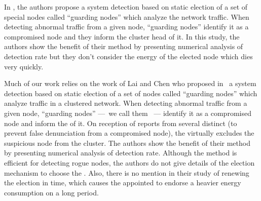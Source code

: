
In
\cite{LC08},
the authors propose a system detection based on static election of a set of special nodes called ``guarding nodes'' which analyze the network traffic.
When detecting abnormal traffic from a given node, ``guarding nodes'' identify it as a compromised node and they inform the cluster head of it.
In this study, the authors show the benefit of their method by presenting numerical analysis of detection rate but they don't consider the energy of the elected node which dies very quickly.


Much of our work relies on the work of Lai and Chen who proposed in~\cite{LC08} a system detection based on static election of a set of nodes called ``guarding nodes'' which analyze traffic in a clustered network.
When detecting abnormal traffic from a given node, ``guarding nodes'' ---~we call them \cns~--- identify it as a compromised node and inform the \ch of it.
On reception of reports from several distinct \cns (to prevent false denunciation from a compromised node), the \CH virtually excludes the suspicious node from the cluster.
The authors show the benefit of their method by presenting numerical analysis of detection rate.
Although the method is efficient for detecting rogue nodes, the authors do not give details of the election mechanism to choose the \cns.
Also, there is no mention in their study of renewing the election in time, which causes the appointed \cns to endorse a heavier energy consumption on a long period.

